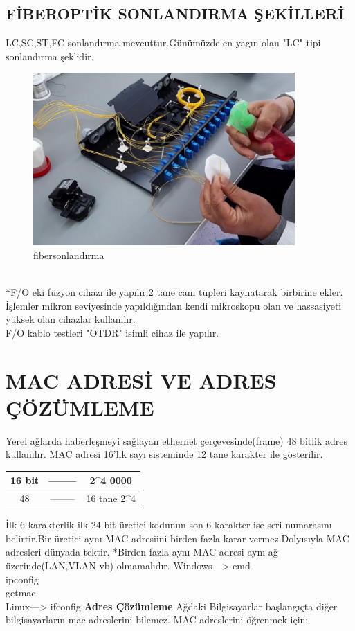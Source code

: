 \subsection*{FİBEROPTİK SONLANDIRMA ŞEKİLLERİ}
LC,SC,ST,FC sonlandırma mevcuttur.Günümüzde en yagın olan "LC" tipi sonlandırma şeklidir.\\
\begin{figure}[ht]
    \centering
    \includegraphics[width=10cm]{images/Fiber-Optik-Ek-ve-Sonlandirma}
    \caption{fibersonlandırma}
    \label{fig:fosonlandirma}
\end{figure}
\\
*F/O eki füzyon cihazı ile yapılır.2 tane cam tüpleri kaynatarak birbirine ekler.\\
İşlemler mikron seviyesinde yapıldığından kendi mikroskopu olan ve hassasiyeti yüksek olan cihazlar kullanılır. \\
F/O kablo testleri "OTDR" isimli cihaz  ile yapılır.
\section*{MAC ADRESİ VE ADRES ÇÖZÜMLEME}
Yerel ağlarda  haberleşmeyi sağlayan ethernet çerçevesinde(frame) 48 bitlik adres kullanılır.
MAC adresi 16'lık sayı sisteminde 12 tane karakter ile gösterilir.

\begin{table}[h]
	\centering
	\begin{tabular}{|c|c|c|}
		\hline
		16 bit & -------- & 2^4 0000 \\
		\hline
		48 & -------- & 16 tane 2^4\\
	\end{tabular}
\end{table}
           
İlk 6 karakterlik ilk 24 bit üretici kodunun son 6 karakter ise seri numarasını belirtir.Bir üretici aynı MAC adresiini birden fazla karar vermez.Dolyısıyla MAC adresleri dünyada tektir.
 *Birden fazla aynı MAC adresi aynı ağ üzerinde(LAN,VLAN vb) olmamalıdır.
 Windows---> cmd\\
             ipconfig\\
             getmac\\
 Linux---> ifconfig
 \textbf{Adres Çözümleme} Ağdaki Bilgisayarlar başlangıçta diğer bilgisayarların mac adreslerini bilemez.
 MAC adreslerini öğrenmek için;
